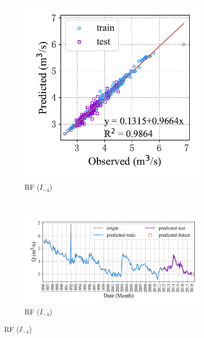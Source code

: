 \begin{figure}[!htbp]
\begin{subfigure}[b]{0.615\textwidth}
  \end{subfigure}
  \\
  \begin{subfigure}[b]{0.305\textwidth}
    \includegraphics[width=\textwidth]{Img/chap4_spr/spr_scatter_in_4_out_1_rf.pdf}
    \vspace{-1.2cm}
    \caption{RF ($I_{-4}$)}
    \label{fig:spr_scatter_in_4_out_1_rf}
  \end{subfigure}
  ~
  \begin{subfigure}[b]{0.615\textwidth}
    \includegraphics[width=\textwidth]{Img/chap4_spr/spr_series_in_4_out_1_rf.pdf}
    \vspace{-1.2cm}
    \caption{RF ($I_{-4}$)}
    \label{fig:spr_series_in_4_out_1_rf}
  \end{subfigure}
  \label{fig:spr_out_1}
\end{figure}

